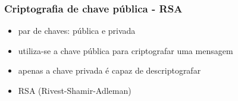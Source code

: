 \begin{frame}
\frametitle{Criptografia de chave pública - RSA}
\begin{itemize}
\item par de chaves: pública e privada
\item utiliza-se a chave pública para criptografar uma mensagem
\item apenas a chave privada é capaz de descriptografar
\item RSA (Rivest-Shamir-Adleman) 
\end{itemize}

\end{frame}
